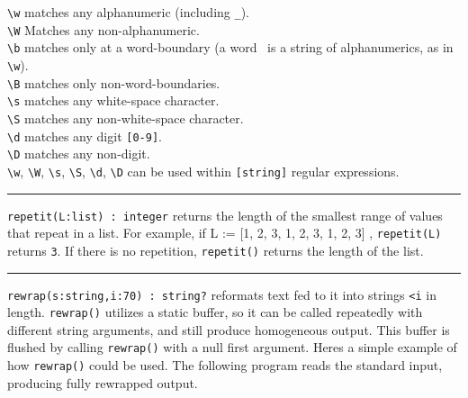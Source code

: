 \texttt{{\textbackslash}w} matches any alphanumeric (including
\texttt{{\textquotedbl}\_{\textquotedbl}}).\\
\texttt{{\textbackslash}W} Matches any non-alphanumeric.\\
\texttt{{\textbackslash}b} matches only at a word-boundary (a word \ is
a string of alphanumerics, as in \texttt{{\textbackslash}w}).\\
\texttt{{\textbackslash}B} matches only non-word-boundaries.\\
\texttt{{\textbackslash}s} matches any white-space character.\\
\texttt{{\textbackslash}S} matches any non-white-space
character.\\
\texttt{{\textbackslash}d} matches any digit \texttt{[0-9]}.\\
\texttt{{\textbackslash}D} matches any non-digit.\\
\texttt{{\textbackslash}w}, \texttt{{\textbackslash}W},
\texttt{{\textbackslash}s}, \texttt{{\textbackslash}S},
\texttt{{\textbackslash}d}, \texttt{{\textbackslash}D} can be used
within \texttt{[string]} regular expressions.

\vspace{0.25cm}\hrule{}

\texttt{repetit(L:list) : integer} returns the length of the smallest
range of values that repeat in a list. For example, if L := [1, 2, 3,
1, 2, 3, 1, 2, 3] , \texttt{repetit(L)} returns \texttt{3}. If there is
no repetition, \texttt{repetit()} returns the length of the list. 

\vspace{0.25cm}\hrule{}

\texttt{rewrap(s:string,i:70) : string?} reformats text fed to it into
strings \texttt{{\textless}i} in length. \texttt{rewrap()} utilizes a
static buffer, so it can be called repeatedly with different string
arguments, and still produce homogeneous output. This buffer is flushed
by calling \texttt{rewrap()} with a null first argument.
Here{\textquotesingle}s a simple example of how \texttt{rewrap()} could
be used. The following program reads the standard input, producing
fully rewrapped output.


